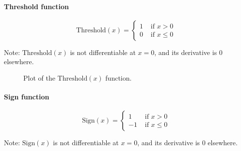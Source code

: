 \documentclass[titlepage]{article}
\begin{document}
        \paragraph{Threshold function}\label{eqthreshold}

          \begin{equation*}
            \text{Threshold} (x) =
              \begin{cases}
                1 & \text{ if } x > 0 \\
                0 & \text{ if } x \leq 0
              \end{cases}
          \end{equation*}

          Note: $\text{Threshold}(x)$ is not differentiable at $x=0$, and its
          derivative is $0$ elsewhere.

          \begin{figure}[!htb]
            \centering
            \caption{%
              Plot of the $\text{Threshold}(x)$ function.
            }
          \end{figure}

        \paragraph{Sign function}

          \begin{equation*}
            \text{Sign} (x) =
              \begin{cases}
                1 & \text{ if } x > 0 \\
                -1 & \text{ if } x \leq 0
              \end{cases}
          \end{equation*}

          Note: $\text{Sign}(x)$ is not differentiable at $x=0$, and its
          derivative is $0$ elsewhere.
\end{document}
